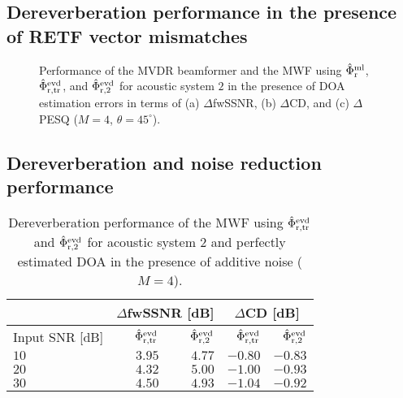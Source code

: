 \documentclass[10pt]{IEEEtran}
\begin{document}
\subsection{Dereverberation performance in the presence of RETF vector mismatches}
\label{sec: doa_errors}
\begin{figure*}[t!]
    \centering
    \subfloat[]{}
    \subfloat[]{}
    \subfloat[]{}
    \caption{Performance of the MVDR beamformer and the MWF using $\hat{\Phi}^{\rm ml}_{\rm r}$, $\hat{\Phi}^{\rm evd}_{\rm r,tr}$, and $\hat{\Phi}^{\rm evd}_{\rm r,2}$ for acoustic system $2$ in the presence of DOA estimation errors in terms of (a) $\Delta$fwSSNR, (b) $\Delta$CD, and (c) $\Delta$PESQ ($M = 4$, $\theta = 45^{\circ}$).}
    \label{fig: reverb_erroneousDOA_s2}
\end{figure*}


\subsection{Dereverberation and noise reduction performance}
\label{sec: noisy_exp}

\begin{table}[t!]
\begin{center}
  \caption{Dereverberation performance of the MWF using $\hat{\Phi}^{\rm evd}_{\rm r,tr}$ and $\hat{\Phi}^{\rm evd}_{\rm r,2}$  for acoustic system $2$ and perfectly estimated DOA in the presence of additive noise ($M = 4$).}
  \label{tbl: spa_reg2}
  \begin{tabularx}{\linewidth}{Xrrrr}
    \toprule
    & \multicolumn{2}{c}{$\Delta$fwSSNR [dB]} & \multicolumn{2}{c}{$\Delta$CD [dB]} \\
    \midrule
    Input SNR [dB] & $\hat{\Phi}^{\rm evd}_{\rm r,tr}$ & $\hat{\Phi}^{\rm evd}_{\rm r,2}$ & $\hat{\Phi}^{\rm evd}_{\rm r,tr}$ & $\hat{\Phi}^{\rm evd}_{\rm r,2}$ \\
    \midrule
    $10$ & $3.95$ & $4.77$ & $-0.80$ & $-0.83$ \\
    $20$ & $4.32$ & $5.00$ & $-1.00$ & $-0.93$ \\
    $30$ & $4.50$ & $4.93$ & $-1.04$ & $-0.92$ \\
    \bottomrule
  \end{tabularx}
\end{center}
\end{table}
\end{document}
